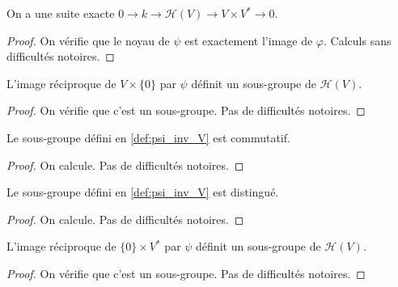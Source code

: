 \begin{proposition}
    \label{exact_seq_h}
    \leanok 

    On a une suite exacte $0\rightarrow k \rightarrow \mathcal{H}(V) \rightarrow
    V\times V^* \rightarrow 0$.
    \begin{proof}
        \leanok
        On vérifie que le noyau de $\psi$ est exactement l'image de $\varphi$. Calculs sans difficultés notoires.
    \end{proof}
\end{proposition}

\begin{definition}[$\psi^{-1}(V)$]
    \label{def:psi_inv_V}
    \leanok 

    L'image réciproque de $V\times\{0\}$ par $\psi$ définit un sous-groupe de $\mathcal{H}(V)$.
    \begin{proof}
        \leanok
        On vérifie que c'est un sous-groupe. Pas de difficultés notoires.
    \end{proof}
\end{definition}

\begin{proposition}
    \label{prop:psi_inv_V_comm}
    \leanok

    Le sous-groupe défini en \ref{def:psi_inv_V} est commutatif.
    \begin{proof}
        \leanok
        On calcule. Pas de difficultés notoires.
    \end{proof}
\end{proposition}

\begin{proposition}
    \label{prop:psi_inv_V_normal}
    \leanok

    Le sous-groupe défini en \ref{def:psi_inv_V} est distingué.
    \begin{proof}
        \leanok 
        On calcule. Pas de difficultés notoires.
    \end{proof}
\end{proposition}

\begin{definition}[$\psi^{-1}(V)$]
    \label{def:psi_inv_Dual}
    \leanok 

    L'image réciproque de $\{0\}\times V^*$ par $\psi$ définit un sous-groupe de $\mathcal{H}(V)$.
    \begin{proof}
        \leanok
        On vérifie que c'est un sous-groupe. Pas de difficultés notoires.
    \end{proof}
\end{definition}
    
